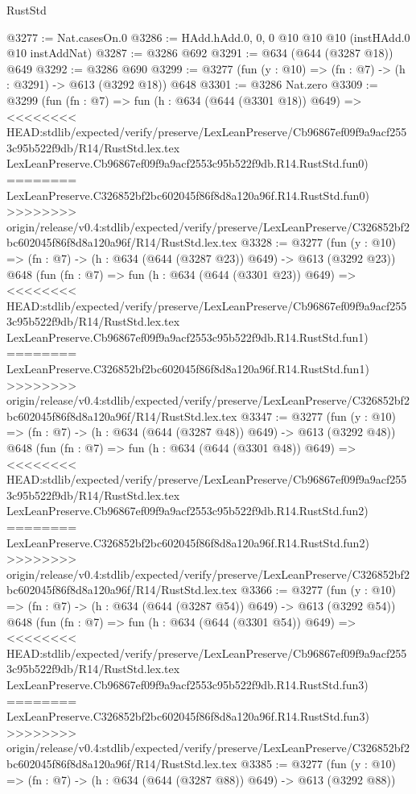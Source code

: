 \begin{lexlean}{RustStd}
\begin{coremodule}
{\begin{coremodule}
{{{{{{{{{{@3277 := Nat.casesOn.{0}
@3286 := HAdd.hAdd.{0, 0, 0} @10 @10 @10 (instHAdd.{0} @10 instAddNat)
@3287 := @3286 @692
@3291 := @634 (@644 (@3287 @18)) @649
@3292 := @3286 @690
@3299 := @3277 (fun (y : @10) => (fn : @7) -> (h : @3291) -> @613 (@3292 @18)) @648
@3301 := @3286 Nat.zero
@3309 := @3299
    (fun (fn : @7) =>
    fun (h : @634 (@644 (@3301 @18)) @649) =>
<<<<<<<< HEAD:stdlib/expected/verify/preserve/LexLeanPreserve/Cb96867ef09f9a9acf2553c95b522f9db/R14/RustStd.lex.tex
    LexLeanPreserve.Cb96867ef09f9a9acf2553c95b522f9db.R14.RustStd.fun0)
========
    LexLeanPreserve.C326852bf2bc602045f86f8d8a120a96f.R14.RustStd.fun0)
>>>>>>>> origin/release/v0.4:stdlib/expected/verify/preserve/LexLeanPreserve/C326852bf2bc602045f86f8d8a120a96f/R14/RustStd.lex.tex
@3328 := @3277
    (fun (y : @10) => (fn : @7) -> (h : @634 (@644 (@3287 @23)) @649) -> @613 (@3292 @23))
    @648
    (fun (fn : @7) =>
    fun (h : @634 (@644 (@3301 @23)) @649) =>
<<<<<<<< HEAD:stdlib/expected/verify/preserve/LexLeanPreserve/Cb96867ef09f9a9acf2553c95b522f9db/R14/RustStd.lex.tex
    LexLeanPreserve.Cb96867ef09f9a9acf2553c95b522f9db.R14.RustStd.fun1)
========
    LexLeanPreserve.C326852bf2bc602045f86f8d8a120a96f.R14.RustStd.fun1)
>>>>>>>> origin/release/v0.4:stdlib/expected/verify/preserve/LexLeanPreserve/C326852bf2bc602045f86f8d8a120a96f/R14/RustStd.lex.tex
@3347 := @3277
    (fun (y : @10) => (fn : @7) -> (h : @634 (@644 (@3287 @48)) @649) -> @613 (@3292 @48))
    @648
    (fun (fn : @7) =>
    fun (h : @634 (@644 (@3301 @48)) @649) =>
<<<<<<<< HEAD:stdlib/expected/verify/preserve/LexLeanPreserve/Cb96867ef09f9a9acf2553c95b522f9db/R14/RustStd.lex.tex
    LexLeanPreserve.Cb96867ef09f9a9acf2553c95b522f9db.R14.RustStd.fun2)
========
    LexLeanPreserve.C326852bf2bc602045f86f8d8a120a96f.R14.RustStd.fun2)
>>>>>>>> origin/release/v0.4:stdlib/expected/verify/preserve/LexLeanPreserve/C326852bf2bc602045f86f8d8a120a96f/R14/RustStd.lex.tex
@3366 := @3277
    (fun (y : @10) => (fn : @7) -> (h : @634 (@644 (@3287 @54)) @649) -> @613 (@3292 @54))
    @648
    (fun (fn : @7) =>
    fun (h : @634 (@644 (@3301 @54)) @649) =>
<<<<<<<< HEAD:stdlib/expected/verify/preserve/LexLeanPreserve/Cb96867ef09f9a9acf2553c95b522f9db/R14/RustStd.lex.tex
    LexLeanPreserve.Cb96867ef09f9a9acf2553c95b522f9db.R14.RustStd.fun3)
========
    LexLeanPreserve.C326852bf2bc602045f86f8d8a120a96f.R14.RustStd.fun3)
>>>>>>>> origin/release/v0.4:stdlib/expected/verify/preserve/LexLeanPreserve/C326852bf2bc602045f86f8d8a120a96f/R14/RustStd.lex.tex
@3385 := @3277
    (fun (y : @10) => (fn : @7) -> (h : @634 (@644 (@3287 @88)) @649) -> @613 (@3292 @88))
}}}}}}}}}}
\end{coremodule}}
\end{coremodule}
\end{lexlean}
